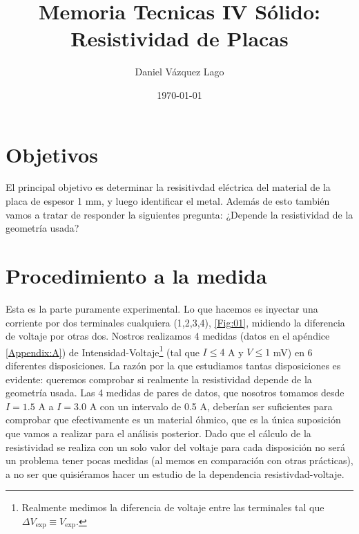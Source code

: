 \documentclass[11pt]{article}
\title{Memoria Tecnicas IV Sólido: Resistividad de Placas}
\author{Daniel Vázquez Lago}
\date{\today}
\begin{document}
\maketitle

\tableofcontents

\setlength{\parskip}{1.8mm}                         %

\newpage

\section{Objetivos} \label{Sec:01}

El principal objetivo es determinar la resisitivdad eléctrica del material de la placa de espesor 1 mm, y luego identificar el metal. Además de esto también vamos a tratar de responder la siguientes pregunta: ¿Depende la resistividad de la geometría usada? 

\section{Procedimiento a la medida}

Esta es la parte puramente experimental. Lo que hacemos es inyectar una corriente por dos terminales cualquiera (1,2,3,4), \cref{Fig:01}, midiendo la diferencia de voltaje por otras dos. Nostros realizamos 4 medidas (datos en el apéndice \ref{Appendix:A}) de Intensidad-Voltaje\footnote{Realmente medimos la diferencia de voltaje entre las terminales tal que $\Delta V_{\exp}\equiv V_{\exp}$.} (tal que $I\leq 4$ A y $V\leq 1$ mV) en 6 diferentes disposiciones. La razón por la que estudiamos tantas disposiciones es evidente: queremos comprobar si realmente la resistividad depende de la geometría usada. Las 4 medidas de pares de datos, que nosotros tomamos desde $I=1.5$ A a $I=3.0$ A con un intervalo de 0.5 A, deberían ser suficientes para comprobar que efectivamente es un material óhmico, que es la única suposición que vamos a realizar para el análisis posterior. Dado que el cálculo de la resistividad se realiza con un solo valor del voltaje para cada disposición no será un problema tener pocas medidas (al memos en comparación con otras prácticas), a no ser que quisiéramos hacer un estudio de la dependencia resistivdad-voltaje.
\end{document}
